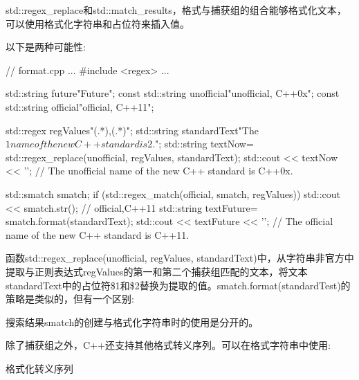 
std::regex\_replace和std::match\_results，格式与捕获组的组合能够格式化文本，可以使用格式化字符串和占位符来插入值。

以下是两种可能性:


\begin{cpp}
// format.cpp
...
#include <regex>
...

std::string future{"Future"};
const std::string unofficial{"unofficial, C++0x"};
const std::string official{"official, C++11"};

std::regex regValues{"(.*),(.*)"};
std::string standardText{"The $1 name of the new C++ standard is $2."};
std::string textNow= std::regex_replace(unofficial, regValues, standardText);
std::cout << textNow << '\n';
			// The unofficial name of the new C++ standard is C++0x.

std::smatch smatch;
if (std::regex_match(official, smatch, regValues)){
	std::cout << smatch.str(); // official,C++11
	std::string textFuture= smatch.format(standardText);
	std::cout << textFuture << '\n';
} // The official name of the new C++ standard is C++11.
\end{cpp}

函数std::regex\_replace(unofficial, regValues, standardText)中，从字符串非官方中提取与正则表达式regValues的第一和第二个捕获组匹配的文本，将文本standardText中的占位符\$1和\$2替换为提取的值。smatch.format(standardTest)的策略是类似的，但有一个区别: 

搜索结果smatch的创建与格式化字符串时的使用是分开的。

除了捕获组之外，C++还支持其他格式转义序列。可以在格式字符串中使用:

\begin{center}
格式化转义序列
\end{center}

